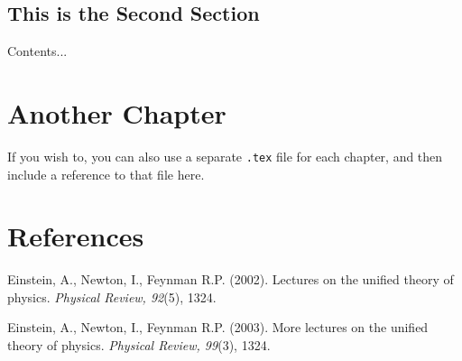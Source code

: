 \section{This is the Second Section}
Contents...

\chapter{Another Chapter} \label{sec: another_chap}
If you wish to, you can also use a separate \texttt{.tex} file for each chapter, and then include a reference to that file here.

\chapter*{References}

\medskip

\begin{list}{}{%
    \setlength{\topsep}{0pt}%
    \setlength{\leftmargin}{0.2in}%
    \setlength{\listparindent}{-0.2in}%
    \setlength{\itemindent}{-0.2in}%
    \setlength{\parsep}{\parskip}%
  }%
  
\item[] Einstein, A., Newton, I., Feynman R.P. (2002). Lectures on the unified theory of physics. \textit{Physical Review, 92}(5), 1324.
  
\item[] Einstein, A., Newton, I., Feynman R.P. (2003). More lectures on the unified theory of physics. \textit{Physical Review, 99}(3), 1324.
\end{list}


